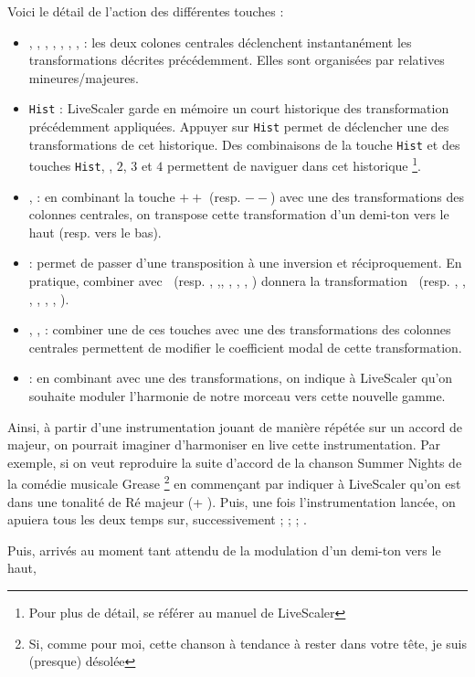 Voici le détail de l'action des différentes touches : 
\begin{itemize}
  \item \LSI, \LSvi, \LSIV, \LSII, \LSV, \LSiii, \LSII, \LSvii :  les deux colones centrales déclenchent instantanément les transformations décrites précédemment. Elles sont organisées par relatives mineures/majeures.
  \item \texttt{Hist} : LiveScaler garde en mémoire un court historique des transformation précédemment appliquées. Appuyer sur \texttt{Hist} permet de déclencher une des transformations de cet historique. Des combinaisons de la touche \texttt{Hist} et des touches \texttt{Hist}, \LSMm, $2$, $3$ et $4$ permettent de naviguer dans cet historique \footnote{Pour plus de détail, se référer au manuel de LiveScaler}. 
  \item \LSpp, \LSmm : en combinant la touche $++$ (resp. $--$) avec une des transformations des colonnes centrales, on transpose cette transformation d'un demi-ton vers le haut (resp. vers le bas). 
  \item  \LSMm : permet de passer d'une transposition à une inversion et réciproquement. En pratique, combiner \LSMm avec \LSI $~$ (resp. \LSvi, \LSIV,\LSII, \LSV, \LSiii, \LSII, \LSvii) donnera la transformation \LSI $~$ (resp. \LSvi, \LSIV, \LSII, \LSV, \LSiii, \LSII, \LSvii).
  \item \LStwo, \LSthree, \LSfour : combiner une de ces touches avec une des transformations des colonnes centrales permettent de modifier le coefficient modal de cette transformation.
  \item \LSMod : en combinant \LSMod avec une des transformations, on indique à LiveScaler qu'on souhaite moduler l'harmonie de notre morceau vers cette nouvelle gamme. 
\end{itemize}

Ainsi, à partir d'une instrumentation jouant de manière répétée sur un accord de  majeur, on pourrait imaginer d'harmoniser en live cette instrumentation. Par exemple, si on veut reproduire la suite d'accord de la chanson Summer Nights de la comédie musicale Grease \footnote{Si, comme pour moi, cette chanson à tendance à rester dans votre tête, je suis (presque) désolée} en commençant par indiquer à LiveScaler qu'on est dans une tonalité de Ré majeur (\LSMod + \LSII). Puis, une fois l'instrumentation lancée, on apuiera tous les deux temps sur, successivement \LSI ; \LSIV ; \LSV ; \LSIV.

Puis, arrivés au moment tant attendu de la modulation d'un demi-ton vers le haut,

